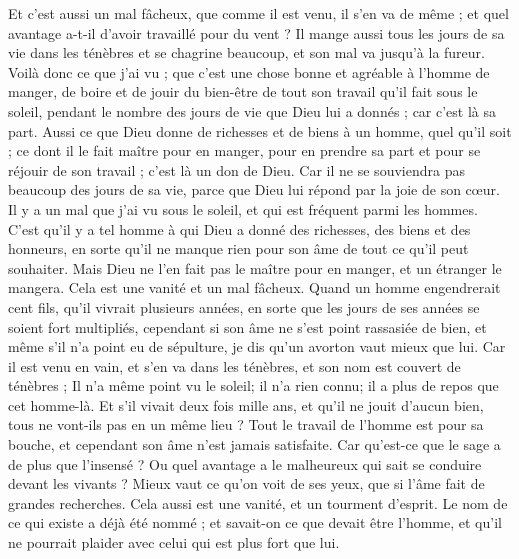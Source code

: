 \begin{multicols}{2}
Et c'est aussi un mal fâcheux, que comme il est venu, il s'en va de même ; et quel avantage a-t-il d'avoir travaillé pour du vent ?
Il mange aussi tous les jours de sa vie dans les ténèbres et se chagrine beaucoup, et son mal va jusqu'à la fureur.
Voilà donc ce que j'ai vu ; que c'est une chose bonne et agréable à l'homme de manger, de boire et de jouir du bien-être de tout son travail qu'il fait sous le soleil, pendant le nombre des jours de vie que Dieu lui a donnés ; car c'est là sa part.
Aussi ce que Dieu donne de richesses et de biens à un homme, quel qu'il soit ; ce dont il le fait maître pour en manger, pour en prendre sa part et pour se réjouir de son travail ; c'est là un don de Dieu. 
Car il ne se souviendra pas beaucoup des jours de sa vie, parce que Dieu lui répond par la joie de son cœur. 
\VerseOne{}Il y a un mal que j'ai vu sous le soleil, et qui est fréquent parmi les hommes.
C'est qu'il y a tel homme à qui Dieu a donné des richesses, des biens et des honneurs, en sorte qu'il ne manque rien pour son âme de tout ce qu'il peut souhaiter. Mais Dieu ne l'en fait pas le maître pour en manger, et un étranger le mangera. Cela est une vanité et un mal fâcheux. 
Quand un homme engendrerait cent fils, qu'il vivrait plusieurs années, en sorte que les jours de ses années se soient fort multipliés, cependant si son âme ne s'est point rassasiée de bien, et même s'il n'a point eu de sépulture, je dis qu'un avorton vaut mieux que lui.
Car il est venu en vain, et s'en va dans les ténèbres, et son nom est couvert de ténèbres ;
Il n'a même point vu le soleil; il n'a rien connu; il a plus de repos que cet homme-là.
Et s'il vivait deux fois mille ans, et qu'il ne jouit d'aucun bien, tous ne vont-ils pas en un même lieu ?
Tout le travail de l'homme est pour sa bouche, et cependant son âme n'est jamais satisfaite.
Car qu'est-ce que le sage a de plus que l'insensé ? Ou quel avantage a le malheureux qui sait se conduire devant les vivants ?
Mieux vaut ce qu'on voit de ses yeux, que si l'âme fait de grandes recherches. Cela aussi est une vanité, et un tourment d'esprit.
Le nom de ce qui existe a déjà été nommé ; et savait-on ce que devait être l'homme, et qu'il ne pourrait plaider avec celui qui est plus fort que lui. 

\end{multicols}
